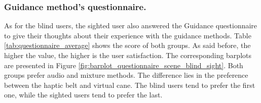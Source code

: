 \subsubsection{Guidance method's questionnaire.}
\label{subsubsec:results_questionnaires_2}

As for the blind users, the sighted user also answered the Guidance questionnaire to give their thoughts about their experience with the guidance methods. Table \ref{tab:questionnaire_average} shows the score of both groups. As said before, the higher the value, the higher is the user satisfaction. The corresponding barplots are presented in Figure \ref{fig:barplot_questionnaire_scene_blind_sight}. Both groups prefer audio  and mixture methods. The difference lies in the preference between the haptic belt and virtual cane. The blind users tend to prefer the first one, while the sighted users tend to prefer the last.



